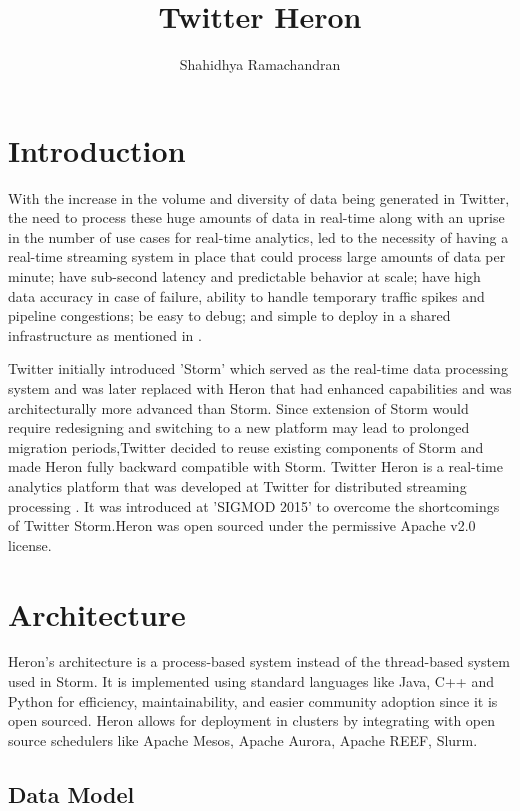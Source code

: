 \documentclass[9pt,twocolumn,twoside]{styles/osajnl}
\title{Twitter Heron}
\author[1]{Shahidhya Ramachandran}
\affil[1]{School of Informatics and Computing, Bloomington, IN 47408, U.S.A.}
\affil[*]{Corresponding authors: shahrama@iu.edu}
\begin{document}
\maketitle

\section{Introduction}

With the increase in the volume and diversity of data being generated in Twitter, the need to process these huge amounts of data in real-time along with an uprise in the number of use cases for real-time analytics, led to the necessity of having a real-time streaming system in place that could process large amounts of data per minute; have sub-second latency and predictable behavior at scale; have high data accuracy in case of failure, ability to handle temporary traffic spikes and pipeline congestions; be easy to debug; and simple to deploy in a shared infrastructure as mentioned in \cite{TwitterHeron1}.

Twitter initially introduced 'Storm' which served as the real-time data processing system and was later  replaced with Heron that had enhanced capabilities and was architecturally more advanced than Storm. Since extension of Storm would require redesigning and switching to a new platform may lead to prolonged migration periods,Twitter decided to reuse existing components of Storm and made Heron fully backward compatible with Storm. Twitter Heron is a real-time analytics platform that was developed at Twitter for distributed streaming processing \cite{www-openSourceHeron}. It was introduced at 'SIGMOD 2015' to overcome the shortcomings of Twitter Storm.Heron was open sourced under the permissive Apache v2.0 license. 

\section{Architecture}
Heron's architecture is a process-based system instead of the thread-based system used in Storm. It is implemented using standard languages like Java, C++ and Python for efficiency, maintainability, and easier community adoption since it is open sourced. Heron allows for deployment in clusters by integrating with open source schedulers like Apache Mesos, Apache Aurora, Apache REEF, Slurm.

\subsection{Data Model}
\end{document}
